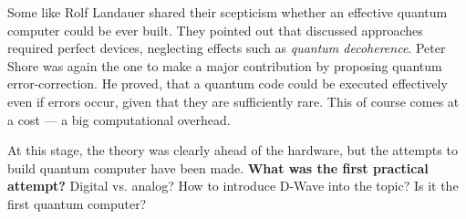 Some like Rolf Landauer shared their scepticism whether an effective quantum computer could be ever built. They pointed out that discussed approaches required perfect devices, neglecting effects such as \textit{quantum decoherence}. Peter Shore was again the one to make a major contribution by proposing quantum error-correction. He proved, that a quantum code could be executed effectively even if errors occur, given that they are sufficiently rare. This of course comes at a cost --- a big computational overhead.

At this stage, the theory was clearly ahead of the hardware, but the attempts to build quantum computer have been made. \textbf{What was the first practical attempt?}
Digital vs. analog? How to introduce D-Wave into the topic? Is it the first quantum computer?
